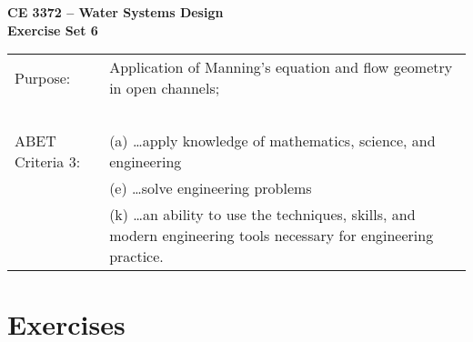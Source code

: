 \documentclass[12pt]{article}
\begin{document}
\begin{center}
{\textbf{{ CE 3372 -- Water Systems Design} \\ {Exercise Set 6}}}
\end{center}

\begingroup
\begin{tabular}{p{1.5in} p{5in}}
Purpose: & Application of Manning's equation and flow geometry in open channels; \\
~ & ~ \\
ABET Criteria 3: & (a) \dots apply knowledge of mathematics, science, and engineering  \\
~ & (e)  \dots solve engineering problems  \\
~ & (k) \dots an ability to use the techniques, skills, and modern engineering tools necessary for engineering practice. \\
\end{tabular}
\endgroup
\section*{\small{Exercises}}
\end{document}

